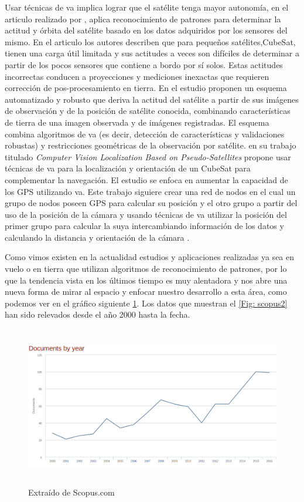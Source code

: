 Usar técnicas de \ac{va} implica lograr que el satélite tenga mayor autonomía, en el articulo realizado por \cite{Kouyama}, aplica reconocimiento de patrones para determinar la actitud y órbita del satélite basado en los datos adquiridos por los sensores del mismo. En el articulo los autores describen que para pequeños satélites,CubeSat, tienen una carga útil limitada y sus actitudes a veces son difíciles de determinar a partir de los pocos sensores que contiene a bordo por sí solos. Estas actitudes incorrectas conducen a proyecciones y mediciones inexactas que requieren corrección de pos-procesamiento en tierra. En el estudio proponen un esquema automatizado y robusto que deriva la actitud del satélite a partir de sus imágenes de observación y de la posición de satélite conocida, combinando características de tierra de una imagen observada y de imágenes registradas. El esquema combina algoritmos de \ac{va} (es decir, detección de características y validaciones robustas) y restricciones geométricas de la observación por satélite. \cite{Huggins} en su trabajo titulado \textit{Computer Vision Localization Based on Pseudo-Satellites} propone usar técnicas de \ac{va} para la localización y orientación de un CubeSat para complementar la navegación. El estudio se enfoca en  aumentar la capacidad de los GPS utilizando \ac{va}. Este trabajo  siguiere crear una red de nodos en el cual un grupo de nodos poseen GPS para calcular su posición y el otro grupo a partir del uso de la posición de la cámara y usando técnicas de  \ac{va}  utilizar la posición del primer grupo para calcular la suya intercambiando información de los datos y calculando la distancia y orientación de la cámara \citep{Huggins}.

Como vimos existen en la actualidad estudios y aplicaciones realizadas ya sea en vuelo o en tierra que utilizan algoritmos de reconocimiento de patrones, por lo que la tendencia vista en los últimos tiempo es muy alentadora y nos abre una nueva forma de mirar al espacio y enfocar nuestro desarrollo a esta área, como podemos ver en el gráfico siguiente \ref{Fig: scopus1}. Los datos que muestran el \ref{Fig: scopus2} han sido relevados desde el año 2000 hasta la fecha.

\begin{figure}[h]
 \centering
  \includegraphics[height=7cm,keepaspectratio=true,clip=true]{imagenes/Logos/scopus.png}
  \caption{Extraído de Scopus.com}
	\label{Fig: scopus1}
\end{figure}

